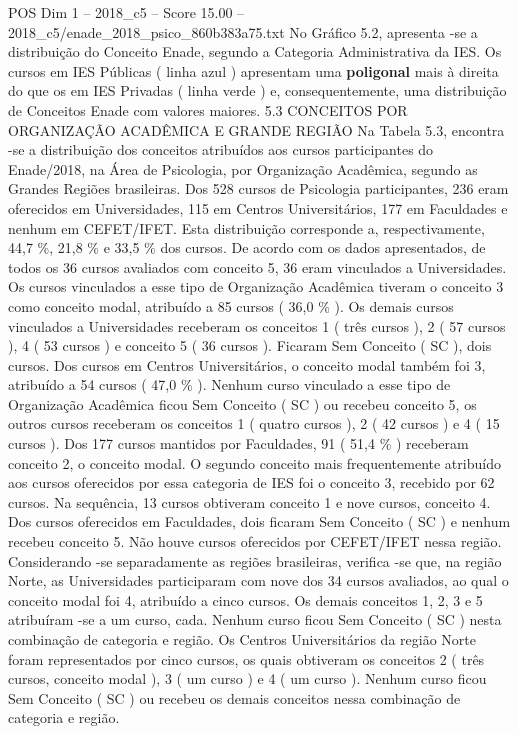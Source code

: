 \begin{textsample}{POS Dim 1 – 2018\_c5 – Score 15.00 – 2018\_c5/enade\_2018\_psico\_860b383a75.txt}
No Gráfico 5.2, apresenta -se a distribuição do Conceito Enade, segundo a Categoria Administrativa da IES.
Os cursos em IES Públicas ( linha azul ) apresentam uma \textbf{poligonal} mais à direita do que os em IES Privadas ( linha verde ) e, consequentemente, uma distribuição de Conceitos Enade com valores maiores. 5.3 CONCEITOS POR ORGANIZAÇÃO ACADÊMICA E GRANDE REGIÃO Na Tabela 5.3, encontra -se a distribuição dos conceitos atribuídos aos cursos participantes do Enade/2018, na Área de Psicologia, por Organização Acadêmica, segundo as Grandes Regiões brasileiras.
Dos 528 cursos de Psicologia participantes, 236 eram oferecidos em Universidades, 115 em Centros Universitários, 177 em Faculdades e nenhum em CEFET/IFET.
Esta distribuição corresponde a, respectivamente, 44,7 \%, 21,8 \% e 33,5 \% dos cursos.
De acordo com os dados apresentados, de todos os 36 cursos avaliados com conceito 5, 36 eram vinculados a Universidades.
Os cursos vinculados a esse tipo de Organização Acadêmica tiveram o conceito 3 como conceito modal, atribuído a 85 cursos ( 36,0 \% ).
Os demais cursos vinculados a Universidades receberam os conceitos 1 ( três cursos ), 2 ( 57 cursos ), 4 ( 53 cursos ) e conceito 5 ( 36 cursos ).
Ficaram Sem Conceito ( SC ), dois cursos.
Dos cursos em Centros Universitários, o conceito modal também foi 3, atribuído a 54 cursos ( 47,0 \% ).
Nenhum curso vinculado a esse tipo de Organização Acadêmica ficou Sem Conceito ( SC ) ou recebeu conceito 5, os outros cursos receberam os conceitos 1 ( quatro cursos ), 2 ( 42 cursos ) e 4 ( 15 cursos ).
Dos 177 cursos mantidos por Faculdades, 91 ( 51,4 \% ) receberam conceito 2, o conceito modal.
O segundo conceito mais frequentemente atribuído aos cursos oferecidos por essa categoria de IES foi o conceito 3, recebido por 62 cursos.
Na sequência, 13 cursos obtiveram conceito 1 e nove cursos, conceito 4.
Dos cursos oferecidos em Faculdades, dois ficaram Sem Conceito ( SC ) e nenhum recebeu conceito 5.
Não houve cursos oferecidos por CEFET/IFET nessa região.
Considerando -se separadamente as regiões brasileiras, verifica -se que, na região Norte, as Universidades participaram com nove dos 34 cursos avaliados, ao qual o conceito modal foi 4, atribuído a cinco cursos.
Os demais conceitos 1, 2, 3 e 5 atribuíram -se a um curso, cada.
Nenhum curso ficou Sem Conceito ( SC ) nesta combinação de categoria e região.
Os Centros Universitários da região Norte foram representados por cinco cursos, os quais obtiveram os conceitos 2 ( três cursos, conceito modal ), 3 ( um curso ) e 4 ( um curso ).
Nenhum curso ficou Sem Conceito ( SC ) ou recebeu os demais conceitos nessa combinação de categoria e região.

\end{textsample}
